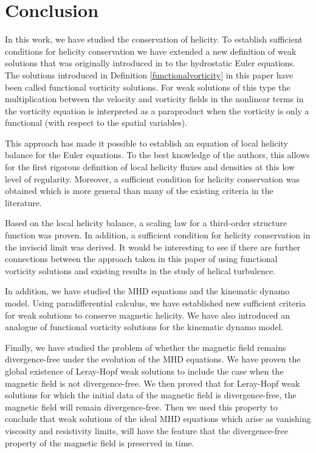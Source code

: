 \documentclass[12pt,a4paper]{article}
\theoremstyle{definition}
\theoremstyle{remark}
\numberwithin{equation}{section}
\begin{document}
\section{Conclusion} \label{conclusion}
In this work, we have studied the conservation of helicity. To establish sufficient conditions for helicity conservation we have extended a new definition of weak solutions that was originally introduced in \cite{boutroshydrostatic} to the hydrostatic Euler equations. The solutions introduced in Definition \ref{functionalvorticity} in this paper have been called functional vorticity solutions. For weak solutions of this type the multiplication between the velocity and vorticity fields in the nonlinear terms in the vorticity equation is interpreted as a paraproduct when the vorticity is only a functional (with respect to the spatial variables). 

This approach has made it possible to establish an equation of local helicity balance for the Euler equations. To the best knowledge of the authors, this allows for the first rigorous definition of local helicity fluxes and densities at this low level of regularity. Moreover, a sufficient condition for helicity conservation was obtained which is more general than many of the existing criteria in the literature. 

Based on the local helicity balance, a scaling law for a third-order structure function was proven. In addition, a sufficient condition for helicity conservation in the inviscid limit was derived. It would be interesting to see if there are further connections between the approach taken in this paper of using functional vorticity solutions and existing results in the study of helical turbulence. 

In addition, we have studied the MHD equations and the kinematic dynamo model. Using paradifferential calculus, we have established new sufficient criteria for weak solutions to conserve magnetic helicity. We have also introduced an analogue of functional vorticity solutions for the kinematic dynamo model. 

Finally, we have studied the problem of whether the magnetic field remains divergence-free under the evolution of the MHD equations. We have proven the global existence of Leray-Hopf weak solutions to include the case when the magnetic field is not divergence-free. We then proved that for Leray-Hopf weak solutions for which the initial data of the magnetic field is divergence-free, the magnetic field will remain divergence-free. Then we used this property to conclude that weak solutions of the ideal MHD equations which arise as vanishing viscosity and resistivity limits, will have the feature that the divergence-free property of the magnetic field is preserved in time.
\end{document}
